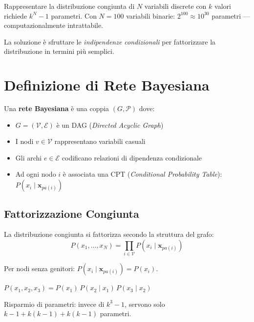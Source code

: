 Rappresentare la distribuzione congiunta di $N$ variabili discrete con $k$ valori richiede $k^N - 1$ parametri. Con $N=100$ variabili binarie: $2^{100} \approx 10^{30}$ parametri — computazionalmente intrattabile.

La soluzione è sfruttare le \emph{indipendenze condizionali} per fattorizzare la distribuzione in termini più semplici.

\section{Definizione di Rete Bayesiana}

\begin{definition}
Una \textbf{rete Bayesiana} è una coppia $(G, \mathcal{P})$ dove:
\begin{itemize}
    \item $G = (\mathcal{V}, \mathcal{E})$ è un DAG (\textit{Directed Acyclic Graph})
    \item I nodi $v \in \mathcal{V}$ rappresentano variabili casuali
    \item Gli archi $e \in \mathcal{E}$ codificano relazioni di dipendenza condizionale
    \item Ad ogni nodo $i$ è associata una CPT (\textit{Conditional Probability Table}): $P(x_i \mid \mathbf{x}_{pa(i)})$
\end{itemize}
\end{definition}

\subsection{Fattorizzazione Congiunta}

La distribuzione congiunta si fattorizza secondo la struttura del grafo:
\[
\boxed{P(x_1, \ldots, x_N) = \prod_{i \in \mathcal{V}} P(x_i \mid \mathbf{x}_{pa(i)})}
\]

Per nodi senza genitori: $P(x_i \mid \mathbf{x}_{pa(i)}) = P(x_i)$.

\begin{tcolorbox}[title=Esempio: catena $X_1 \to X_2 \to X_3$]
$P(x_1, x_2, x_3) = P(x_1)\,P(x_2 \mid x_1)\,P(x_3 \mid x_2)$

Risparmio di parametri: invece di $k^3-1$, servono solo $k-1 + k(k-1) + k(k-1)$ parametri.
\end{tcolorbox}

